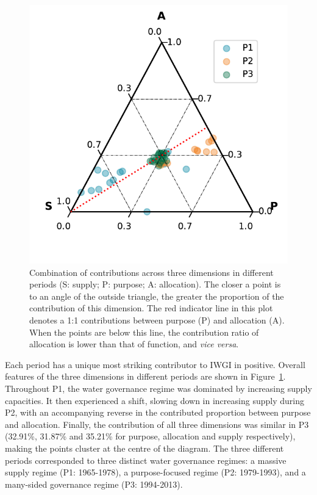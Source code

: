 \documentclass[9pt, twocolumn, twoside, lineno]{pnas-new}
\begin{document}
\begin{figure}[!htbp]
	\centering
	\includegraphics[width=0.9\linewidth]{../../figures/main/phases.pdf}
	\caption{Combination of contributions across three dimensions in different periods (S: supply; P: purpose; A: allocation). The closer a point is to an angle of the outside triangle, the greater the proportion of the contribution of this dimension.
	The red indicator line in this plot denotes a 1:1 contributions between purpose (P) and allocation (A). When the points are below this line, the contribution ratio of allocation is lower than that of function, and \textit{vice versa}.}
	\label{fig:phases}
\end{figure}

Each period has a unique most striking contributor to IWGI in positive. Overall features of the three dimensions in different periods are shown in Figure~\ref{fig:phases}.
Throughout P1, the water governance regime was dominated by increasing supply capacities. 
It then experienced a shift, slowing down in increasing supply during P2, with an accompanying reverse in the contributed proportion between purpose and allocation. Finally, the contribution of all three dimensions was similar in P3 (32.91\%, 31.87\% and 35.21\% for purpose, allocation and supply respectively), making the points cluster at the centre of the diagram. 
The three different periods corresponded to three distinct water governance regimes: a massive supply regime (P1: 1965-1978), a purpose-focused regime (P2: 1979-1993), and a many-sided governance regime (P3: 1994-2013). 
\end{document}
